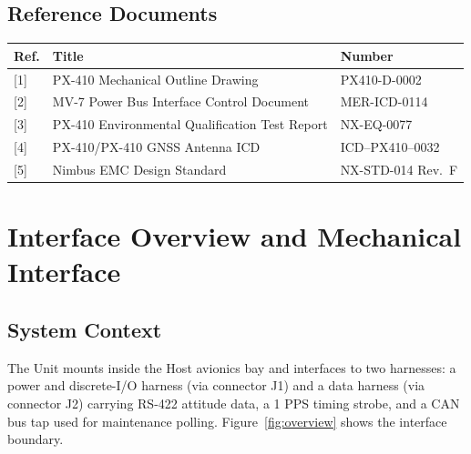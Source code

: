 \documentclass[11pt,a4paper]{scrreprt}
\begin{document}
\section{Reference Documents}
\begin{table}[H]
\centering
\begin{tabularx}{\textwidth}{@{}l Y l@{}}
\toprule
{}
\color{white}\bfseries Ref. & \color{white}\bfseries Title & \color{white}\bfseries Number \\
\midrule
{[}1{]} & PX-410 Mechanical Outline Drawing & PX410-D-0002 \\
{[}2{]} & MV-7 Power Bus Interface Control Document & MER-ICD-0114 \\
{[}3{]} & PX-410 Environmental Qualification Test Report & NX-EQ-0077 \\
{[}4{]} & PX-410/PX-410 GNSS Antenna ICD & ICD--PX410--0032 \\
{[}5{]} & Nimbus EMC Design Standard & NX-STD-014 Rev.\ F \\
\bottomrule
\end{tabularx}
\end{table}

\chapter{Interface Overview and Mechanical Interface}

\section{System Context}
The Unit mounts inside the Host avionics bay and interfaces to two harnesses: a power and
discrete-I/O harness (via connector J1) and a data harness (via connector J2) carrying
RS-422 attitude data, a 1 PPS timing strobe, and a CAN bus tap used for maintenance polling.
Figure~\ref{fig:overview} shows the interface boundary.
\end{document}
